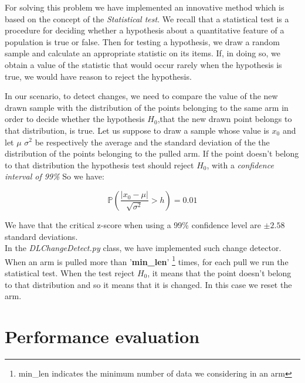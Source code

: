 For solving this problem we have implemented an innovative method which is based on the concept of the \textit{Statistical test}.
We recall that a statistical test is a procedure for deciding whether a hypothesis about a quantitative feature of a population is true or false. Then for testing a hypothesis, we draw a random sample and calculate an appropriate statistic on its items. If, in doing so, we obtain a value of the statistic that would occur rarely when the hypothesis is true, we would have reason to reject the hypothesis.

In our scenario, to detect changes, we need to compare the value of the new drawn sample with the distribution of the points belonging to the same arm in order to decide whether the hypothesis $H_0$,that the new drawn point belongs to that distribution, is true.
Let us suppose to draw a sample whose value is $x_0$ and let $\mu$ $\sigma^2$ be respectively the average
and the standard deviation of the the distribution of the points belonging to the pulled arm. 
If the point doesn't belong to that distribution the hypothesis test should reject $H_0$, with a \textit{confidence interval of 99\%} So we have:

\begin{equation}
	 \mathbb{P}\left(\frac{|x_0 - \mu|}{\sqrt{\sigma^2}} > h \right) = 0.01
\end{equation}

We have that the critical z-score when using a 99\% confidence level are $\pm 2.58$ standard deviations.\\

In the \textit{DLChangeDetect.py} class, we have implemented such change detector. When an arm is pulled more than '\textbf{min\_len}' \footnote{min\_len indicates the minimum number of data we considering in an arm} times, for each pull we run the statistical test. When the test reject $H_0$, it means that the point doesn't belong to that distribution and so it means that it is changed. In this case we reset the arm.\\ 

\section{Performance evaluation}

